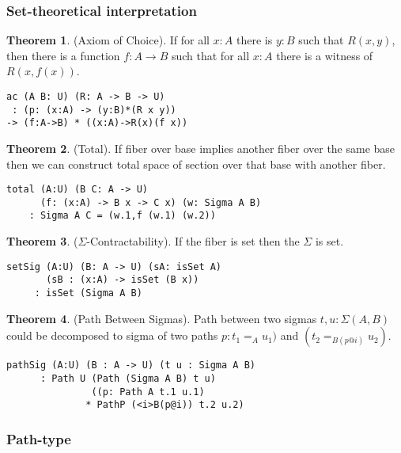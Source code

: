 \documentclass{article}
\theoremstyle{definition}
\newtheorem{theorem}{Theorem}
\begin{document}
\subsubsection*{Set-theoretical interpretation}

\begin{theorem} (Axiom of Choice).
If for all $x : A$ there is $y : B$ such that $R(x,y)$,
then there is a function $f : A \rightarrow B$
such that for all $x : A$ there is a witness of $R(x,f(x))$.
\begin{lstlisting}
ac (A B: U) (R: A -> B -> U)
 : (p: (x:A) -> (y:B)*(R x y))
-> (f:A->B) * ((x:A)->R(x)(f x))
\end{lstlisting}
\end{theorem}

\begin{theorem} (Total).
If fiber over base implies another fiber
over the same base then we can construct total space of section
over that base with another fiber.
\begin{lstlisting}
total (A:U) (B C: A -> U)
      (f: (x:A) -> B x -> C x) (w: Sigma A B)
    : Sigma A C = (w.1,f (w.1) (w.2))
\end{lstlisting}
\end{theorem}

\begin{theorem} ($\Sigma$-Contractability). If the fiber is set then the $\Sigma$ is set.
\begin{lstlisting}
setSig (A:U) (B: A -> U) (sA: isSet A)
       (sB : (x:A) -> isSet (B x))
     : isSet (Sigma A B)
\end{lstlisting}
\end{theorem}

\begin{theorem} (Path Between Sigmas).
Path between two sigmas $t,u: \Sigma(A,B)$ could be decomposed to
sigma of two paths $p:t_1=_{A}u_1)$ and $(t_2=_{B(p@i)}u_2)$.
\begin{lstlisting}
pathSig (A:U) (B : A -> U) (t u : Sigma A B)
      : Path U (Path (Sigma A B) t u)
               ((p: Path A t.1 u.1)
              * PathP (<i>B(p@i)) t.2 u.2)
\end{lstlisting}
\end{theorem}

\subsubsection{Path-type}
\end{document}
